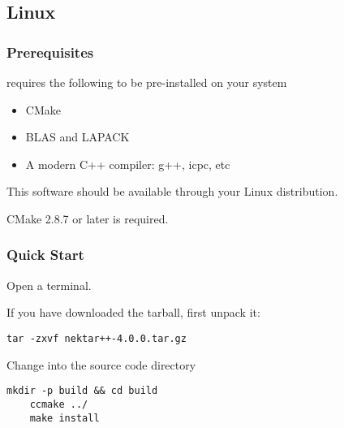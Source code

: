 \subsection{Linux}
\subsubsection{Prerequisites}
\nekpp requires the following to be pre-installed on your system
\begin{itemize}
	\item CMake
	\item BLAS and LAPACK
	\item A modern C++ compiler: g++, icpc, etc
\end{itemize}
This software should be available through your Linux distribution.

\begin{notebox}
CMake 2.8.7 or later is required.
\end{notebox}


\subsubsection{Quick Start}
Open a terminal.

If you have downloaded the tarball, first unpack it:
\begin{lstlisting}[style=BashInputStyle]
    tar -zxvf nektar++-4.0.0.tar.gz
\end{lstlisting}
Change into the  source code directory
\begin{lstlisting}[style=BashInputStyle]
    mkdir -p build && cd build 
    ccmake ../
    make install
\end{lstlisting}

